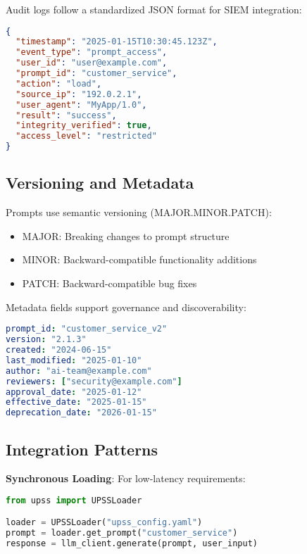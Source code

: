 Audit logs follow a standardized JSON format for SIEM integration:

\begin{lstlisting}[language=json,caption=Audit Log Entry]
{
  "timestamp": "2025-01-15T10:30:45.123Z",
  "event_type": "prompt_access",
  "user_id": "user@example.com",
  "prompt_id": "customer_service",
  "action": "load",
  "source_ip": "192.0.2.1",
  "user_agent": "MyApp/1.0",
  "result": "success",
  "integrity_verified": true,
  "access_level": "restricted"
}
\end{lstlisting}

\subsection{Versioning and Metadata}

Prompts use semantic versioning (MAJOR.MINOR.PATCH):

\begin{itemize}
    \item MAJOR: Breaking changes to prompt structure
    \item MINOR: Backward-compatible functionality additions
    \item PATCH: Backward-compatible bug fixes
\end{itemize}

Metadata fields support governance and discoverability:

\begin{lstlisting}[language=yaml,caption=Prompt Metadata Example]
prompt_id: "customer_service_v2"
version: "2.1.3"
created: "2024-06-15"
last_modified: "2025-01-10"
author: "ai-team@example.com"
reviewers: ["security@example.com"]
approval_date: "2025-01-12"
effective_date: "2025-01-15"
deprecation_date: "2026-01-15"
\end{lstlisting}

\subsection{Integration Patterns}

\textbf{Synchronous Loading}: For low-latency requirements:

\begin{lstlisting}[language=Python,caption=Synchronous Integration]
from upss import UPSSLoader

loader = UPSSLoader("upss_config.yaml")
prompt = loader.get_prompt("customer_service")
response = llm_client.generate(prompt, user_input)
\end{lstlisting}

